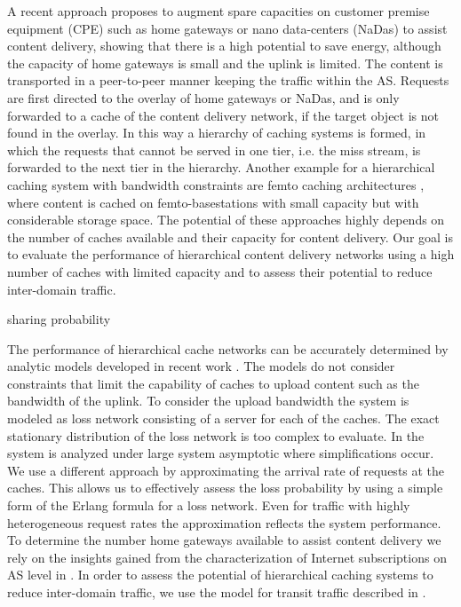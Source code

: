 A recent approach \cite{valancius2009greening} proposes to augment spare capacities on customer premise equipment (CPE) such as home gateways or nano data-centers (NaDas) to assist content delivery, showing that there is a high potential to save energy, although the capacity of home gateways is small and the uplink is limited.
The content is transported in a peer-to-peer manner keeping the traffic within the AS.
Requests are first directed to the overlay of home gateways or NaDas, and is only forwarded to a cache of the content delivery network, if the target object is not found in the overlay.
In this way a hierarchy of caching systems is formed, in which the requests that cannot be served in one tier, i.e. the miss stream, is forwarded to the next tier in the hierarchy.
Another example for a hierarchical caching system with bandwidth constraints are femto caching architectures \cite{golrezaei2013femtocaching}, where content is cached on femto-basestations with small capacity but with considerable storage space.
The potential of these approaches highly depends on the number of caches available and their capacity for content delivery.
Our goal is to evaluate the performance of hierarchical content delivery networks using a high number of caches with limited capacity and to assess their potential to reduce inter-domain traffic.

sharing probability


The performance of hierarchical cache networks can be accurately determined by analytic models developed in recent work \cite{che2002hierarchical, martina2014unified}.
The models do not consider constraints that limit the capability of caches to upload content such as the bandwidth of the uplink.
To consider the upload bandwidth the system is modeled as loss network consisting of a server for each of the caches. The exact stationary distribution of the loss network is too complex to evaluate.
In \cite{tan2013optimal} the system is analyzed under large system asymptotic where simplifications occur.
We use a different approach by approximating the arrival rate of requests at the caches.
This allows us to effectively assess the loss probability by using a simple form of the Erlang formula for a loss network.
Even for traffic with highly heterogeneous request rates the approximation reflects the system performance.
To determine the number home gateways available to assist content delivery we rely on the insights gained from the characterization of Internet subscriptions on AS level in .
 In order to assess the potential of hierarchical caching systems to reduce inter-domain traffic, we use the model for transit traffic described in .

